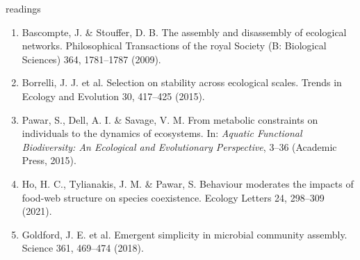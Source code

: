   
  \begin{frame}{readings}
  
  \begin{enumerate}\setlength{\itemindent}{-2em}\itemsep4pt
  

    \item Bascompte, J. \& Stouffer, D. B. The assembly and disassembly of ecological networks. Philosophical Transactions of the royal Society (B: Biological Sciences) 364, 1781--1787 (2009).

    \item Borrelli, J. J. et al. Selection on stability across ecological scales. Trends in Ecology and Evolution 30, 417--425 (2015).

    \item Pawar, S., Dell, A. I. \& Savage, V. M. From metabolic constraints on individuals to the dynamics of ecosystems. In: {\it Aquatic Functional Biodiversity: An Ecological and Evolutionary Perspective}, 3--36 (Academic Press, 2015).
    
    
    
    \item Ho, H. C., Tylianakis, J. M. \& Pawar, S. Behaviour moderates the impacts of food-web structure on species coexistence. Ecology Letters 24, 298--309 (2021).
    
    \item Goldford, J. E. et al. Emergent simplicity in microbial community assembly. Science 361, 469--474 (2018).

\end{enumerate}
  
\end{frame}

